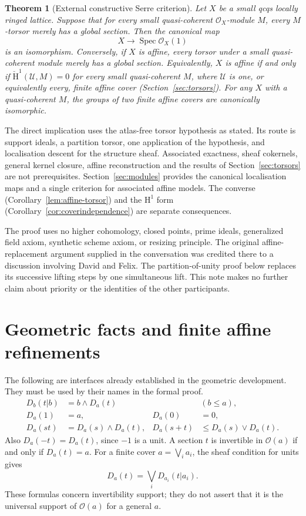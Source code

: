 \documentclass[11pt]{amsart}
\newtheorem{theorem}{Theorem}[section]
\theoremstyle{definition}\newtheorem{definition}[theorem]{Definition}
\theoremstyle{remark}\newtheorem{remark}[theorem]{Remark}
\newcommand{\OO}{\mathcal O}
\newcommand{\Spec}{\operatorname{Spec}}
\newcommand{\HH}{\mathrm H}
\newcommand{\CC}{\check{\mathrm H}}
\begin{document}
\begin{theorem}[External constructive Serre criterion]\label{thm:serre}
Let $X$ be a small qcqs locally ringed lattice. Suppose that for every
small quasi-coherent $\OO_X$-module $M$, every $M$-torsor merely has a
global section. Then the canonical map
\[
 X\longrightarrow\Spec\OO_X(1)
\]
is an isomorphism. Conversely, if $X$ is affine, every torsor under a
small quasi-coherent module merely has a global section. Equivalently,
$X$ is affine if and only if $\CC^1(\mathcal U,M)=0$ for every small
quasi-coherent $M$, where $\mathcal U$ is one, or equivalently every,
finite affine cover (Section~\ref{sec:torsors}). For any $X$ with a
quasi-coherent $M$, the groups of two finite affine covers are
canonically isomorphic.
\end{theorem}

The direct implication uses the atlas-free torsor hypothesis as stated.
Its route is support ideals, a partition torsor, one
application of the hypothesis, and localisation descent for the
structure sheaf. Associated exactness, sheaf cokernels, general kernel
closure, affine reconstruction and the results of
Section~\ref{sec:torsors} are not prerequisites. Section~\ref{sec:modules}
provides the canonical localisation maps and a single criterion for
associated affine models. The converse
(Corollary~\ref{lem:affine-torsor}) and the $\HH^1$ form
(Corollary~\ref{cor:coverindependence}) are separate consequences.

The proof uses no higher cohomology, closed points, prime ideals,
generalized field axiom, synthetic scheme axiom, or resizing principle.
The original affine-replacement argument supplied in the conversation
was credited there to a discussion involving David and Felix. The
partition-of-unity proof below replaces its successive lifting steps
by one simultaneous lift. This note makes no further claim about priority or
the identities of the other participants.

\section{Geometric facts and finite affine refinements}
The following are interfaces already established in the geometric
development. They must be used by their names in the formal proof.
\begin{align}
 D_b(t|b)&=b\wedge D_a(t) &&(b\le a),\label{eq:restrict-support}\\
 D_a(1)&=a,&D_a(0)&=0,\label{eq:support01}\\
 D_a(st)&=D_a(s)\wedge D_a(t),&
 D_a(s+t)&\le D_a(s)\vee D_a(t).\label{eq:supportops}
\end{align}
Also $D_a(-t)=D_a(t)$, since $-1$ is a unit. A section $t$ is
invertible in $\OO(a)$ if and only if $D_a(t)=a$. For a finite cover
$a=\bigvee_i a_i$, the sheaf condition for units gives
\begin{equation}\label{eq:join-support}
 D_a(t)=\bigvee_i D_{a_i}(t|a_i).
\end{equation}
These formulas concern invertibility support; they do not assert that
it is the universal support of $\OO(a)$ for a general $a$.
\end{document}
